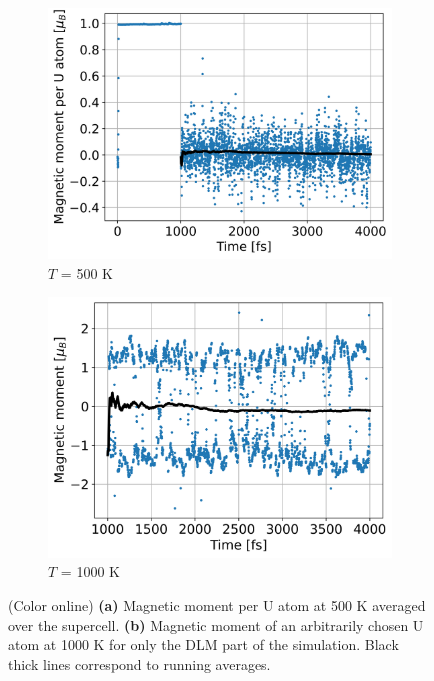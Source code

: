 \documentclass[preprint, 12pt]{elsarticle}
\newcommand{\?}{\stackrel{?}{=}}
\begin{document}
\begin{figure}[h!]
\centering
\begin{subfigure}{0.48\textwidth}
    \includegraphics[width=\textwidth]{500-MagMom.png}
    \caption{$T$ = 500 K}
    \label{Fig:500-MagMom}
\end{subfigure}
\hfill
\begin{subfigure}{0.48\textwidth}
    \includegraphics[width=\textwidth]{AtomMagMom-1000.png}
    \caption{$T$ = 1000 K}
    \label{Fig:AtomMagMom-1000}
\end{subfigure}
\caption{(Color online) \textbf{(a)} Magnetic moment per U atom at 500 K averaged over the supercell. \textbf{(b)} Magnetic moment of an arbitrarily chosen U atom at 1000 K for only the DLM part of the simulation. Black thick lines correspond to running averages.}
\label{fig:magmom}
\end{figure}
\end{document}
